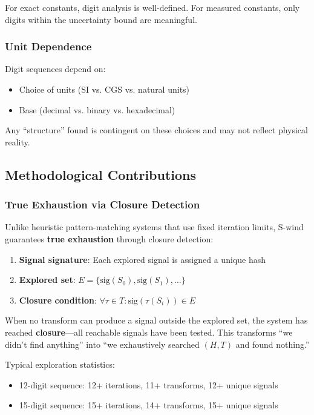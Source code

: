\documentclass[twocolumn,showpacs,preprintnumbers,amsmath,amssymb,prl]{revtex4-2}
\begin{document}
For exact constants, digit analysis is well-defined. For measured constants, only digits within the uncertainty bound are meaningful.

\subsubsection{Unit Dependence}

Digit sequences depend on:
\begin{itemize}
    \item Choice of units (SI vs. CGS vs. natural units)
    \item Base (decimal vs. binary vs. hexadecimal)
\end{itemize}

Any ``structure'' found is contingent on these choices and may not reflect physical reality.

\subsection{Methodological Contributions}

\subsubsection{True Exhaustion via Closure Detection}

Unlike heuristic pattern-matching systems that use fixed iteration limits, S-wind guarantees \textbf{true exhaustion} through closure detection:

\begin{enumerate}
    \item \textbf{Signal signature}: Each explored signal is assigned a unique hash
    \item \textbf{Explored set}: $E = \{\text{sig}(S_0), \text{sig}(S_1), \ldots\}$
    \item \textbf{Closure condition}: $\forall \tau \in T: \text{sig}(\tau(S_i)) \in E$
\end{enumerate}

When no transform can produce a signal outside the explored set, the system has reached \textbf{closure}---all reachable signals have been tested. This transforms ``we didn't find anything'' into ``we exhaustively searched $(H, T)$ and found nothing.''

Typical exploration statistics:
\begin{itemize}
    \item 12-digit sequence: 12+ iterations, 11+ transforms, 12+ unique signals
    \item 15-digit sequence: 15+ iterations, 14+ transforms, 15+ unique signals
\end{itemize}
\end{document}
